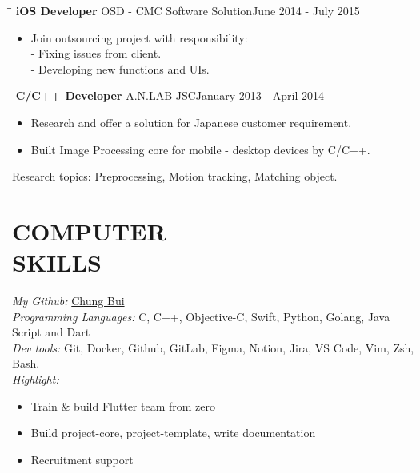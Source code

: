 \documentclass[margin, 10pt]{res}
\begin{document}
\begin{resume}
   \begin{tabbing}
   \hspace{2.0in}\= \hspace{2.0in}\= \kill %
   {\bf iOS Developer} \>OSD - CMC  Software Solution\>June 2014 - July 2015\\
   \end{tabbing}\vspace{-20pt} %

   \begin{itemize}
   		\item Join outsourcing project with responsibility: \\ - Fixing issues from client. \\ - Developing new functions and UIs. 
		
   \end{itemize}

   \begin{tabbing}
   \hspace{2.0in}\= \hspace{2.0in}\= \kill %
   {\bf C/C++ Developer} \>A.N.LAB JSC\>January 2013 - April 2014\\
   \end{tabbing}\vspace{-20pt} %

   \begin{itemize}
   		\item Research and offer a solution for Japanese customer requirement. 
		\item Built Image Processing core for mobile - desktop devices by C/C++.		
		
   \end{itemize}
   Research topics: Preprocessing, Motion tracking, Matching object.
	
\section{COMPUTER \\ SKILLS}
	{\sl My Github:} {\color{blue}\href{https://github.com/chungbd}{Chung Bui}}\\
	{\sl Programming Languages:} C, C++, Objective-C, Swift, Python, Golang, Java Script and Dart\\
	{\sl Dev tools:} Git, Docker, Github, GitLab, Figma, Notion, Jira, VS Code, Vim, Zsh, Bash.\\
	{\sl Highlight:}
	\begin{itemize}
		\item Train \& build Flutter team from zero
		\item Build project-core, project-template, write documentation
		\item Recruitment support
	\end{itemize}


\end{resume}
\end{document}
